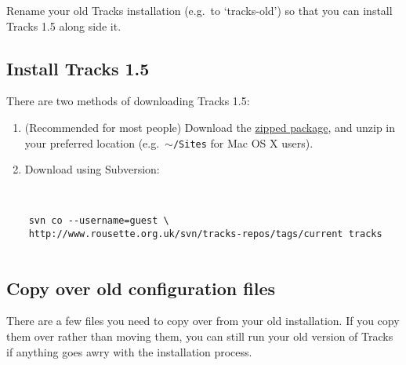 \documentclass[10pt,twoside]{memoir}
\begin{document}
Rename your old Tracks installation (e.g.\ to `tracks-old') so that you can install Tracks 1.5 along side it.


\subsection{Install Tracks 1.5}
\label{install_upgrade}

There are two methods of downloading Tracks 1.5:


\begin{enumerate}


\item (Recommended for most people) Download the \href{http://www.rousette.org.uk/projects/files/tracks-current.zip}{zipped package}, and unzip in your preferred location (e.g.\ \texttt{\ensuremath{\sim}/Sites} for Mac OS X users).

\item Download using Subversion:
\end{enumerate}

\begin{adjustwidth}{2.5em}{2.5em}
\begin{verbatim}


    svn co --username=guest \ 
    http://www.rousette.org.uk/svn/tracks-repos/tags/current tracks


\end{verbatim}
\end{adjustwidth}

\subsection{Copy over old configuration files}
\label{config_upgrade}

There are a few files you need to copy over from your old installation. If you copy them over rather than moving them, you can still run your old version of Tracks if anything goes awry with the installation process.
\end{document}
